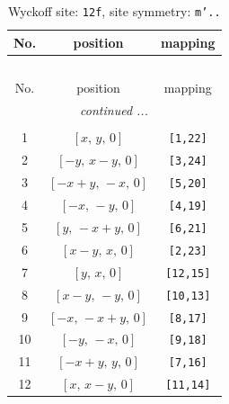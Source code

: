 \documentclass[fleqn,8pt]{jsarticle}
\begin{document}
\begin{longtable}{ccc}
\caption{Wyckoff site: {\tt 12f}, site symmetry: {\tt m'..}}
 \\
 \hline \hline
No. & position & mapping \\ \hline \endfirsthead

\multicolumn{2}{l}{\tablename\ \thetable{}} \\
 \hline \hline
No. & position & mapping \\ \hline \endhead

 \hline \hline
\multicolumn{2}{r}{\footnotesize\it continued ...} \\ \endfoot

 \hline \hline
\multicolumn{2}{r}{} \\ \endlastfoot

1 & $\left[ x,\, y,\, 0 \right]$ & {\tt [1,22]} \\ \hline
2 & $\left[ - y,\, x - y,\, 0 \right]$ & {\tt [3,24]} \\ \hline
3 & $\left[ - x + y,\, - x,\, 0 \right]$ & {\tt [5,20]} \\ \hline
4 & $\left[ - x,\, - y,\, 0 \right]$ & {\tt [4,19]} \\ \hline
5 & $\left[ y,\, - x + y,\, 0 \right]$ & {\tt [6,21]} \\ \hline
6 & $\left[ x - y,\, x,\, 0 \right]$ & {\tt [2,23]} \\ \hline
7 & $\left[ y,\, x,\, 0 \right]$ & {\tt [12,15]} \\ \hline
8 & $\left[ x - y,\, - y,\, 0 \right]$ & {\tt [10,13]} \\ \hline
9 & $\left[ - x,\, - x + y,\, 0 \right]$ & {\tt [8,17]} \\ \hline
10 & $\left[ - y,\, - x,\, 0 \right]$ & {\tt [9,18]} \\ \hline
11 & $\left[ - x + y,\, y,\, 0 \right]$ & {\tt [7,16]} \\ \hline
12 & $\left[ x,\, x - y,\, 0 \right]$ & {\tt [11,14]} \\
\end{longtable}
\renewcommand{\arraystretch}{1.2}
\end{document}
